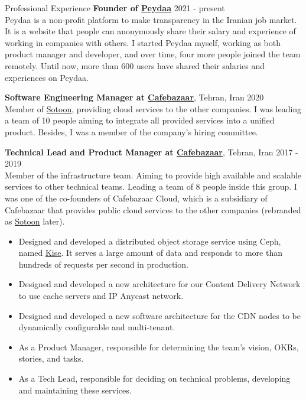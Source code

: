\documentclass{resume} %
\begin{document}
\begin{rSection}{Professional Experience}
	{\bf Founder of \href{https://peydaa.ir/}{Peydaa}} \hfill 2021 - present
	\smallskip
	\\ Peydaa is a non-profit platform to make transparency in the Iranian job market. It is a website that people can anonymously share their salary and experience of working in companies with others. I started Peydaa myself, working as both product manager and developer, and over time, four more people joined the team remotely. Until now, more than 600 users have shared their salaries and experiences on Peydaa.

	{\bf Software Engineering Manager at \href{https://cafebazaar.ir/}{Cafebazaar}}, Tehran, Iran \hfill 2020
	\smallskip
	\\ Member of \href{https://sotoon.ir/}{Sotoon}, providing cloud services to the other companies. I was leading a team of 10 people aiming to integrate all provided services into a unified product. Besides, I was a member of the company's hiring committee.
	
	{\bf Technical Lead and Product Manager at \href{https://cafebazaar.ir/}{Cafebazaar}}, Tehran, Iran \hfill 2017 - 2019
	\smallskip
	\\ Member of the infrastructure team. Aiming to provide high available and scalable services to other technical teams. Leading a team of 8 people inside this group. I was one of the co-founders of Cafebazaar Cloud, which is a subsidiary of Cafebazaar that provides public cloud services to the other companies (rebranded as \href{https://sotoon.ir/}{Sotoon} later).
	\vspace{-0.5em}
	\begin{itemize}[leftmargin=3mm]
		\setlength{\itemsep}{1pt}
		\setlength{\parskip}{0pt}
		\setlength{\parsep}{0pt}
		\renewcommand\labelitemi{$\cdot$}

		\item Designed and developed a distributed object storage service using Ceph, named \href{https://kise.roo.cloud/}{Kise}. It serves a large amount of data and responds to more than hundreds of requests per second in production.
		\item Designed and developed a new architecture for our Content Delivery Network to use cache servers and IP Anycast network.
		\item Designed and developed a new software architecture for the CDN nodes to be dynamically configurable and multi-tenant.
		\item As a Product Manager, responsible for determining the team's vision, OKRs, stories, and tasks.
		\item As a Tech Lead, responsible for deciding on technical problems, developing and maintaining these services.
	\end{itemize}
	

\end{rSection}
\end{document}
